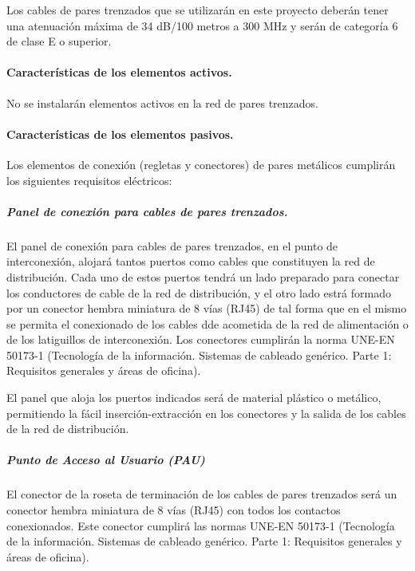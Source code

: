 Los cables de pares trenzados que se utilizarán en este proyecto deberán tener una atenuación máxima de 34 dB/100 metros a 300 MHz y serán de categoría 6 de clase E o superior.
\paragraph{Características de los elementos activos.}
No se instalarán elementos activos en la red de pares trenzados.
\paragraph{Características de los elementos pasivos.}
Los elementos de conexión (regletas y conectores) de pares metálicos cumplirán los siguientes requisitos eléctricos:

\subparagraph{Panel de conexión para cables de pares trenzados.}
El panel de conexión para cables de pares trenzados, en el punto de interconexión, alojará tantos puertos como cables que constituyen la red de distribución. Cada uno de estos puertos tendrá un lado preparado para conectar los conductores de cable de la red de distribución, y el otro lado estrá formado por un conector hembra miniatura de 8 vías (RJ45) de tal forma que en el mismo se permita el conexionado de los cables dde acometida de la red de alimentación o de los latiguillos de interconexión. Los conectores cumplirán la norma UNE-EN 50173-1 (Tecnología de la información. Sistemas de cableado genérico. Parte 1: Requisitos generales y áreas de oficina).

El panel que aloja los puertos indicados será de material plástico o metálico, permitiendo la fácil inserción-extracción en los conectores y la salida de los cables de la red de distribución.

\subparagraph{Punto de Acceso al Usuario (PAU)}
El conector de la roseta de terminación de los cables de pares trenzados será un conector hembra miniatura de 8 vías (RJ45) con todos los contactos conexionados. Este conector cumplirá las normas UNE-EN 50173-1 (Tecnología de la información. Sistemas de cableado genérico. Parte 1: Requisitos generales y áreas de oficina).

